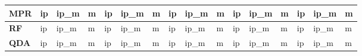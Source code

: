 \begin{table}[htbp]
{\begin{tabular}{cl|lll|lll|lll|lll|lll}
\hline
\multicolumn{2}{l|}{\textbf{MPR}} & ip         & ip\_m      & m          & ip         & ip\_m      & m          & ip         & ip\_m      & m          & ip         & ip\_m      & m          & ip         & ip\_m      & m           \\
\hline

\hline
\hline
\hline

\hline
\multicolumn{2}{l|}{\textbf{RF}}  & ip         & ip\_m      & m          & ip         & ip\_m      & m          & ip         & ip\_m      & m          & ip         & ip\_m      & m          & ip         & ip\_m      & m           \\
\hline

\hline
\hline
\hline

\hline
\multicolumn{2}{l|}{\textbf{QDA}} & ip         & ip\_m      & m          & ip         & ip\_m      & m          & ip         & ip\_m      & m          & ip         & ip\_m      & m          & ip         & ip\_m      & m           \\
\hline

\hline
\hline
\hline
\end{tabular}

  }
\end{table}